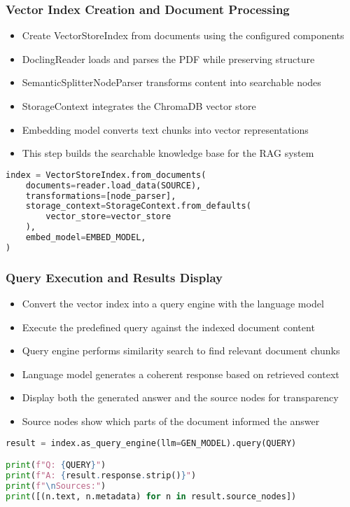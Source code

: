 \begin{frame}[fragile]\frametitle{Vector Index Creation and Document Processing}
      \begin{itemize}
          \item Create VectorStoreIndex from documents using the configured components
          \item DoclingReader loads and parses the PDF while preserving structure
          \item SemanticSplitterNodeParser transforms content into searchable nodes
          \item StorageContext integrates the ChromaDB vector store
          \item Embedding model converts text chunks into vector representations
          \item This step builds the searchable knowledge base for the RAG system
      \end{itemize}
      
\begin{lstlisting}[language=Python, basicstyle=\tiny]
index = VectorStoreIndex.from_documents(
    documents=reader.load_data(SOURCE),
    transformations=[node_parser],
    storage_context=StorageContext.from_defaults(
        vector_store=vector_store
    ),
    embed_model=EMBED_MODEL,
)
\end{lstlisting}
\end{frame}

\begin{frame}[fragile]\frametitle{Query Execution and Results Display}
      \begin{itemize}
          \item Convert the vector index into a query engine with the language model
          \item Execute the predefined query against the indexed document content
          \item Query engine performs similarity search to find relevant document chunks
          \item Language model generates a coherent response based on retrieved context
          \item Display both the generated answer and the source nodes for transparency
          \item Source nodes show which parts of the document informed the answer
      \end{itemize}
      
\begin{lstlisting}[language=Python, basicstyle=\tiny]
result = index.as_query_engine(llm=GEN_MODEL).query(QUERY)

print(f"Q: {QUERY}")
print(f"A: {result.response.strip()}")
print(f"\nSources:")
print([(n.text, n.metadata) for n in result.source_nodes])
\end{lstlisting}
\end{frame}

